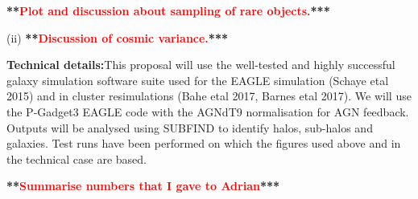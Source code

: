 \documentclass[a4paper,11pt]{article}
\newcommand{\red}[1]{{\textcolor{red}{#1}}}
\newcommand{\todo}[1]{{\bf ***\red{#1}***}}
\begin{document}
\todo{Plot and discussion about sampling of rare objects.}

(ii) \todo{Discussion of cosmic variance.}

{\bf Technical details:}This proposal will use the well-tested and highly
successful galaxy simulation software suite used for the EAGLE simulation
(Schaye etal 2015) and in cluster resimulations (Bahe etal 2017, Barnes etal
2017).  We will use the P-Gadget3 EAGLE code with the AGNdT9 normalisation for
AGN feedback.  Outputs will be analysed using SUBFIND to identify halos,
sub-halos and galaxies.  Test runs have been performed on which the figures used
above and in the technical case are based.

\todo{Summarise numbers that I gave to Adrian}
\end{document}
